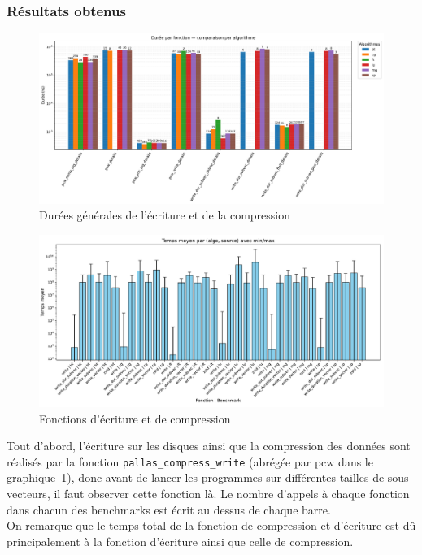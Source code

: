 \subsubsection{Résultats obtenus}\label{ssec:wrt_res}

\begin{figure}[!h]
    \centering
    \includegraphics[width=1\textwidth]{img/pcw_global.png}
    \caption{Durées générales de l'écriture et de la compression}
    \label{fig:pcw_global}
\end{figure}
\begin{figure}[!h]
    \centering
    \includegraphics[width=1\textwidth]{img/nas_comp_write.pdf}
    \caption{Fonctions d'écriture et de compression}
    \label{fig:cw_global}
\end{figure}
Tout d'abord, l'écriture sur les disques ainsi que la compression des données sont réalisés par la fonction \verb!pallas_compress_write! (abrégée par pcw dans le graphique~\ref{fig:pcw_global}),
donc avant de lancer les programmes sur différentes tailles de sous-vecteurs, il faut observer cette fonction là.
Le nombre d'appels à chaque fonction dans chacun des benchmarks est écrit au dessus de chaque barre.\\
On remarque que le temps total de la fonction de compression et d'écriture est dû principalement à la fonction d'écriture ainsi que celle de compression.

